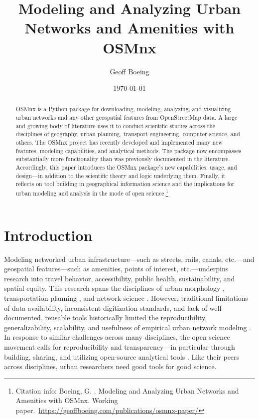 \documentclass[12pt,letterpaper]{article} %
\makeatletter
\newcommand{\myname}{Geoff Boeing}
\newcommand{\myemail}{boeing@usc.edu}
\newcommand{\myaffiliation}{University of Southern California}
\newcommand{\paperdate}{\monthyeardate\today}
\newcommand{\papertitle}{Modeling and Analyzing Urban Networks and Amenities with OSMnx}
\newcommand{\papercitation}{Boeing, G. \the\year. \papertitle. Working paper.\ \href{https://geoffboeing.com/publications/osmnx-paper/}{https://geoffboeing.com/publications/osmnx-paper/}}
\makeatother
\begin{document}
\title{\papertitle}
\author[]{\myname}
\affil[]{\myaffiliation}
\date{\paperdate}

\maketitle

\begin{abstract}

OSMnx is a Python package for downloading, modeling, analyzing, and visualizing urban networks and any other geospatial features from OpenStreetMap data. A large and growing body of literature uses it to conduct scientific studies across the disciplines of geography, urban planning, transport engineering, computer science, and others. The OSMnx project has recently developed and implemented many new features, modeling capabilities, and analytical methods. The package now encompasses substantially more functionality than was previously documented in the literature. Accordingly, this paper introduces the OSMnx package's new capabilities, usage, and design---in addition to the scientific theory and logic underlying them. Finally, it reflects on tool building in geographical information science and the implications for urban modeling and analysis in the mode of open science.\footnote{Citation info: \papercitation}%

\end{abstract}

\section{Introduction}

Modeling networked urban infrastructure---such as streets, rails, canals, etc.---and geospatial features---such as amenities, points of interest, etc.---underpins research into travel behavior, accessibility, public health, sustainability, and spatial equity. This research spans the disciplines of urban morphology \citep[e.g.,][]{gervasoni_calculating_2017,dacci_signature_2019,coutrot_entropy_2022}, transportation planning \citep[e.g.,][]{merchan_quantifying_2020,liao_disparities_2020,natera_orozco_data-driven_2020}, and network science \citep[e.g.,][]{feng_spatial_2020,yin_multi-task_2020,young_automatic_2020}. However, traditional limitations of data availability, inconsistent digitization standards, and lack of well-documented, reusable tools historically limited the reproducibility, generalizability, scalability, and usefulness of empirical urban network modeling \citep{liu_generalized_2022}. In response to similar challenges across many disciplines, the open science movement calls for reproducibility and transparency---in particular through building, sharing, and utilizing open-source analytical tools \citep{rey_show_2009,singleton_establishing_2016,rey_pysal:_2019,kedron_reproducibility_2021}. Like their peers across disciplines, urban researchers need good tools for good science.
\end{document}
